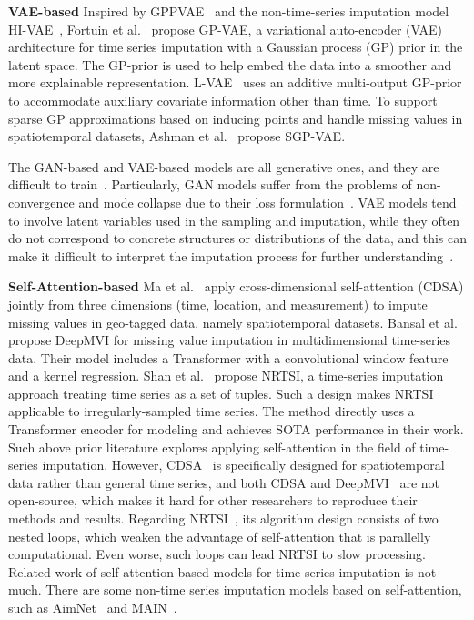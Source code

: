 \documentclass{article}
\begin{document}
\textbf{VAE-based} \hspace{1em}
Inspired by GPPVAE~\cite{Casale2018GPPVAE} and the non-time-series imputation model HI-VAE~\cite{Nazabal2020HIVAE}, Fortuin et al.~\cite{Fortuin2020GPVAE} propose GP-VAE, a variational auto-encoder (VAE) architecture for time series imputation with a Gaussian process (GP) prior in the latent space. The GP-prior is used to help embed the data into a smoother and more explainable representation. L-VAE~\cite{Ramchandran2021LVAE} uses an additive multi-output GP-prior to accommodate auxiliary covariate information other than time. To support sparse GP approximations based on inducing points and handle missing values in spatiotemporal datasets, Ashman et al.~\cite{Ashman2020SGPVAE} propose SGP-VAE.

The GAN-based and VAE-based models are all generative ones, and they are difficult to train~\cite{Wu2020AimNet}. Particularly, GAN models suffer from the problems of non-convergence and mode collapse due to their loss formulation~\cite{Salimans2016GAN}. VAE models tend to involve latent variables used in the sampling and imputation, while they often do not correspond to concrete structures or distributions of the data, and this can make it difficult to interpret the imputation process for further understanding~\cite{Wu2020AimNet}.

\textbf{Self-Attention-based} \hspace{1em}
Ma et al.~\cite{Ma2019CDSA} apply cross-dimensional self-attention (CDSA) jointly from three dimensions (time, location, and measurement) to impute missing values in geo-tagged data, namely spatiotemporal datasets. Bansal et al.~\cite{Bansal2021DeepMVI} propose DeepMVI for missing value imputation in multidimensional time-series data. Their model includes a Transformer with a convolutional window feature and a kernel regression. Shan et al.~\cite{Shan2021NRTSI} propose NRTSI, a time-series imputation approach treating time series as a set of  tuples. Such a design makes NRTSI applicable to irregularly-sampled time series. The method directly uses a Transformer encoder for modeling and achieves SOTA performance in their work. Such above prior literature explores applying self-attention in the field of time-series imputation. However, CDSA~\cite{Ma2019CDSA} is specifically designed for spatiotemporal data rather than general time series, and both CDSA and DeepMVI~\cite{Bansal2021DeepMVI} are not open-source, which makes it hard for other researchers to reproduce their methods and results. Regarding NRTSI~\cite{Shan2021NRTSI}, its algorithm design consists of two nested loops, which weaken the advantage of self-attention that is parallelly computational. Even worse, such loops can lead NRTSI to slow processing. Related work of self-attention-based models for time-series imputation is not much. There are some non-time series imputation models based on self-attention, such as AimNet~\cite{Wu2020AimNet} and MAIN~\cite{Mouselinos2021MAIN}.
\end{document}
